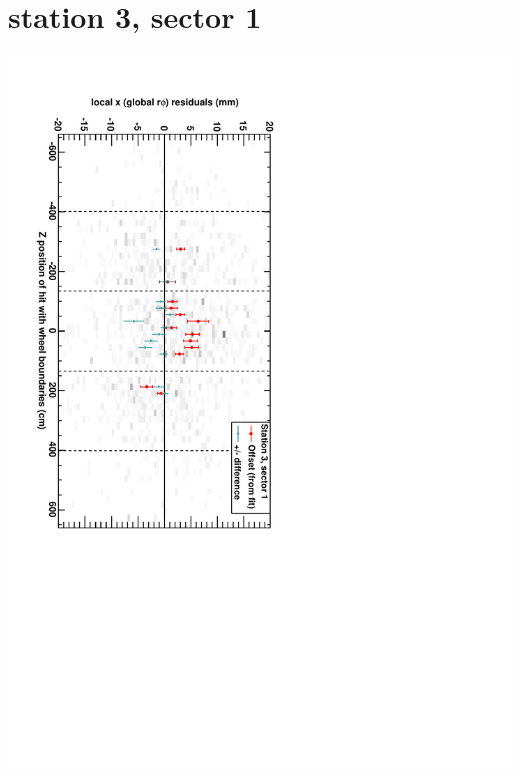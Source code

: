 \documentclass[compress]{beamer}
\begin{document}
\section*{station 3, sector 1}
\begin{frame} \vfill \mbox{\hspace{-1 cm}\includegraphics[height=1.2\linewidth, angle=90]{DTrphiVsZ_st3_sr01.pdf}} \end{frame}
\end{document}
